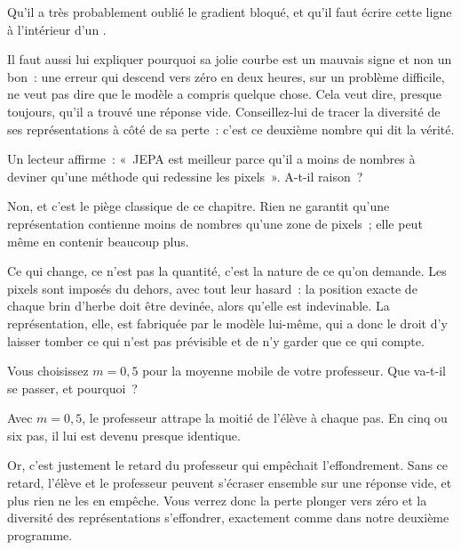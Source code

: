 \begin{solution}
Qu'il a très probablement oublié le gradient bloqué, et qu'il faut écrire
cette ligne à l'intérieur d'un .

Il faut aussi lui expliquer pourquoi sa jolie courbe est un mauvais signe et
non un bon~: une erreur qui descend vers zéro en deux heures, sur un
problème difficile, ne veut pas dire que le modèle a compris quelque chose.
Cela veut dire, presque toujours, qu'il a trouvé une réponse vide.
Conseillez-lui de tracer la diversité de ses représentations à côté de sa
perte~: c'est ce deuxième nombre qui dit la vérité.
\end{solution}

\begin{exercice}
Un lecteur affirme~: «~JEPA est meilleur parce qu'il a moins de nombres à
deviner qu'une méthode qui redessine les pixels~». A-t-il raison~?
\end{exercice}

\begin{solution}
Non, et c'est le piège classique de ce chapitre. Rien ne garantit qu'une
représentation contienne moins de nombres qu'une zone de pixels~; elle peut
même en contenir beaucoup plus.

Ce qui change, ce n'est pas la quantité, c'est la nature de ce qu'on
demande. Les pixels sont imposés du dehors, avec tout leur hasard~: la
position exacte de chaque brin d'herbe doit être devinée, alors qu'elle est
indevinable. La représentation, elle, est fabriquée par le modèle lui-même,
qui a donc le droit d'y laisser tomber ce qui n'est pas prévisible et de n'y
garder que ce qui compte.
\end{solution}

\begin{exercice}
Vous choisissez $m = 0{,}5$ pour la moyenne mobile de votre professeur. Que
va-t-il se passer, et pourquoi~?
\end{exercice}

\begin{solution}
Avec $m = 0{,}5$, le professeur attrape la moitié de l'élève à chaque pas.
En cinq ou six pas, il lui est devenu presque identique.

Or, c'est justement le retard du professeur qui empêchait l'effondrement.
Sans ce retard, l'élève et le professeur peuvent s'écraser ensemble sur une
réponse vide, et plus rien ne les en empêche. Vous verrez donc la perte
plonger vers zéro et la diversité des représentations s'effondrer, exactement
comme dans notre deuxième programme.
\end{solution}

